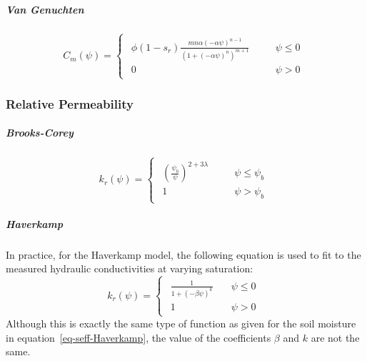 \documentclass[fleqn]{article}
\begin{document}
\subparagraph{Van Genuchten}
\begin{equation}
  C_m(\psi) =
  \begin{cases}
    \begin{aligned}
      \phi ( 1 - s_r)
      \frac
      {
        m n \alpha (-\alpha\psi)^{n-1}
      }
      {
        \left( 1 + \left( -\alpha\psi \right)^{n} \right)^{m+1}
      }
        & \quad & \psi \leq 0 \\
      0 & \quad & \psi > 0
    \end{aligned}
  \end{cases}
  \label{eq-Cm-vanGenuchten}
\end{equation}


\subsubsection{Relative Permeability}
\subparagraph{Brooks-Corey}
\begin{equation}
  k_r(\psi)  =
  \begin{cases}
    \begin{aligned}
      \left( \frac{\psi_b}{\psi} \right)^{2 + 3\lambda} & \quad & \psi \leq \psi_b \\
      1                                                 & \quad & \psi > \psi_b
    \end{aligned}
  \end{cases}
  \label{eq-kr-BrooksCorey}
\end{equation}

\subparagraph{Haverkamp}
In practice, for the Haverkamp model, the following equation is used to fit
to the measured hydraulic conductivities at varying saturation:
\begin{equation}
  k_r(\psi)  =
  \begin{cases}
    \begin{aligned}
      \frac{1}
      {
        1 + \left( -\beta\psi \right)^{k}
      } \quad & \psi \leq 0 \\
      1 \quad & \psi > 0
    \end{aligned}
  \end{cases}
  \label{eq-kr-Haverkamp}
\end{equation}
Although this is exactly the same type of function as given for the
soil moisture in equation~\ref{eq-seff-Haverkamp}, the value of the
coefficients $\beta$ and $k$ are not the same.
\end{document}
